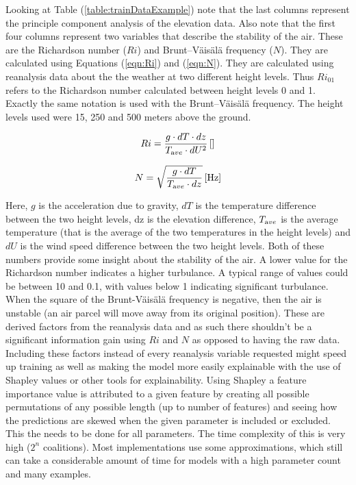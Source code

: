 Looking at Table (\ref{table:trainDataExample}) note that the last \nPCA columns represent the principle component analysis of the elevation data. Also note that the first four columns represent two variables that describe the stability of the air. These are the Richardson number ($Ri$)\cite{richardson_number_skybrary} and Brunt–Väisälä frequency\cite{brunt_vaisala_freq_eumtrain} ($N$). They are calculated using Equations (\ref{eqn:Ri}) and (\ref{eqn:N})\cite{mean_gust_HA_HO}. They are calculated using reanalysis data about the the weather at two different height levels. Thus $Ri_{01}$ refers to the Richardson number calculated between height levels 0 and 1. Exactly the same notation is used with the Brunt–Väisälä frequency. The height levels used were 15, 250 and 500 meters above the ground.

\begin{equation}
    \label{eqn:Ri}
    Ri = \frac{g \cdot dT \cdot dz}{T_{\textrm ave} \cdot dU^2} \, \mathrm{[]}
\end{equation}

\begin{equation}
    \label{eqn:N}
    N = \sqrt{\frac{g \cdot dT }{T_{\textrm ave} \cdot dz}} \, \mathrm{[Hz]}
\end{equation}

Here, $g$ is the acceleration due to gravity, $dT$ is the temperature difference between the two height levels, dz is the elevation difference, $T_{\textrm ave}$ is the average temperature (that is the average of the two temperatures in the height levels) and $dU$ is the wind speed difference between the two height levels. Both of these numbers provide some insight about the stability of the air. A lower value for the Richardson number indicates a higher turbulance. A typical range of values could be between 10 and 0.1, with values below 1 indicating significant turbulance\cite{richardson_number_skybrary}. When the square of the Brunt-Väisälä frequency is negative, then the air is unstable (an air parcel will move away from its original position)\cite{brunt_vaisala_freq_eumtrain}. These are derived factors from the reanalysis data and as such there shouldn't be a significant information gain using $Ri$ and $N$ as opposed to having the raw data. Including these factors instead of every reanalysis variable requested might speed up training as well as making the model more easily explainable with the use of Shapley values or other tools for explainability. Using Shapley a feature importance value is attributed to a given feature by creating all possible permutations of any possible length (up to number of features) and seeing how the predictions are skewed when the given parameter is included or excluded. This the needs to be done for all parameters. The time complexity of this is very high ($2^n$ coalitions)\cite{shapley_information}. Most implementations use some approximations, which still can take a considerable amount of time for models with a high parameter count and many examples.

